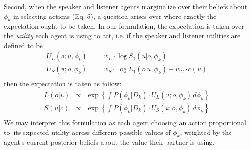 \documentclass[11pt, floatsintext]{apa6}
\begin{document}

Second, when the speaker and listener agents marginalize over their beliefs about $\phi_k$ in selecting actions (Eq. 5), a question arises over where exactly the expectation ought to be taken. 
In our formulation, the expectation is taken over the \emph{utility} each agent is using to act, i.e. if the speaker and listener utilities are defined to be 
$$
\begin{array}{rcl}
U_L(o;u, \phi_k) & = & w_L \cdot \log S_1(u|o, \phi_k)\\
U_S(u;o, \phi_k) & = & w_S \cdot \log L_1(o|u, \phi_k) - w_C \cdot c(u) \\
\end{array}
$$
then the expectation is taken as follow:
$$
\begin{array}{rcl}
L(o|u) & \propto & \exp\left\{\int P(\phi_k |D_k)\cdot U_L(u; o, \phi_k) \, d \phi_k\right\}\\
S(u|o) & \propto & \exp\left\{\int P(\phi_k | D_k) \cdot U_S(u; o, \phi_k) \, d \phi_k\right\} \\
\end{array}
$$
We may interpret this formulation as each agent choosing an action proportional to its expected utility across different possible values of $\phi_k$, weighted by the agent's current posterior beliefs about the value their partner is using.
\end{document}
